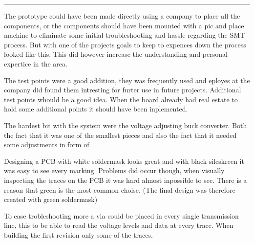 \vspace{-10ex}%
\rule{\textwidth}{0.3pt}
\vspace{5ex}


The prototype could have been made directly using a company to place all the components, or the components should have been mounted with a pic and place machine to eliminate some initial troubleshooting and hassle regarding the SMT process. But with one of the projects goals to keep to expences down the process looked like this. This did however increase the understanding and personal expertice in the area. 
\newline

The test points were a good addition, they was frequently used and eployes at the company did found them intresting for furter use in future projects.
Additional test points whould be a good idea. When the board already had real estate to hold some additional points it should have been inplemented. 

The hardest bit with the system were the voltage adjusting buck converter. Both the fact that it was one of the smallest pieces and also the fact that it needed some adjustments in form of 
\newline

Designing a PCB with white soldermask looks great and with black silcskreen it was easy to see every marking. Problems did occur though, when visually inspecting the traces on the PCB it was hard almost inpossible to see. There is a reason that green is the most common choise. (The final design was therefore created with green soldermask)

To ease trobleshooting more a via could be placed in every single transmission line, this to be able to read the voltage levels and data at every trace. When building the first revision only some of the traces.